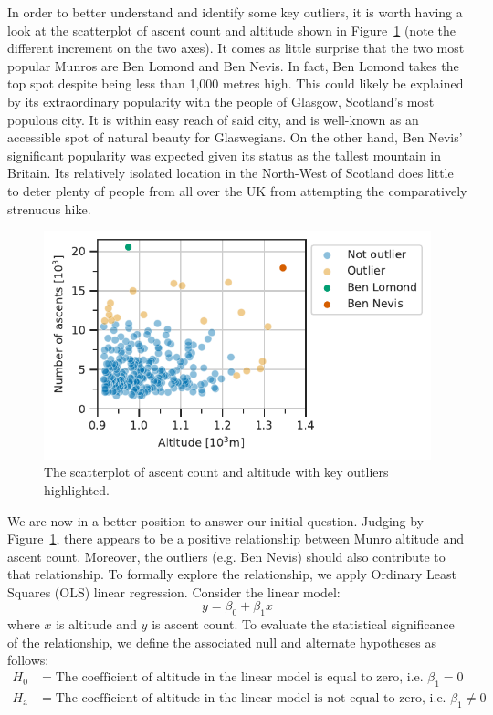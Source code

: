 \documentclass[11pt,a4paper]{article}
\begin{document}
In order to better understand and identify some key outliers, it is worth having a look at the scatterplot of ascent count and altitude shown in Figure~\ref{fds-project-template:fig:scatterplot} (note the different increment on the two axes). It comes as little surprise that the two most popular Munros are Ben Lomond and Ben Nevis. In fact, Ben Lomond takes the top spot despite being less than 1,000 metres high. This could likely be explained by its extraordinary popularity with the people of Glasgow, Scotland's most populous city. It is within easy reach of said city, and is well-known as an accessible spot of natural beauty for Glaswegians. On the other hand, Ben Nevis' significant popularity was expected given its status as the tallest mountain in Britain. Its relatively isolated location in the North-West of Scotland does little to deter plenty of people from all over the UK from attempting the comparatively strenuous hike.

\begin{figure} [h!]
  \centering
  \includegraphics{report/scatterplot.pdf}
  \caption{The scatterplot of ascent count and altitude with key outliers highlighted.}
  \label{fds-project-template:fig:scatterplot}
\end{figure}

We are now in a better position to answer our initial question. Judging by Figure~\ref{fds-project-template:fig:scatterplot}, there appears to be a positive relationship between Munro altitude and ascent count. Moreover, the outliers (e.g. Ben Nevis) should also contribute to that relationship. To formally explore the relationship, we apply Ordinary Least Squares (OLS) linear regression. Consider the linear model: 
$$y=\beta_0 + \beta_1 x$$
where $x$ is altitude and $y$ is ascent count. To evaluate the statistical significance of the relationship, we define the associated null and alternate hypotheses as follows:
\begin{align*}
    H_0 &= \text{The coefficient of altitude in the linear model is equal to zero, i.e. $\beta_1=0$}\\
    H_\text{a} &= \text{The coefficient of altitude in the linear model is not equal to zero, i.e. $\beta_1\neq0$}
\end{align*}
\end{document}
